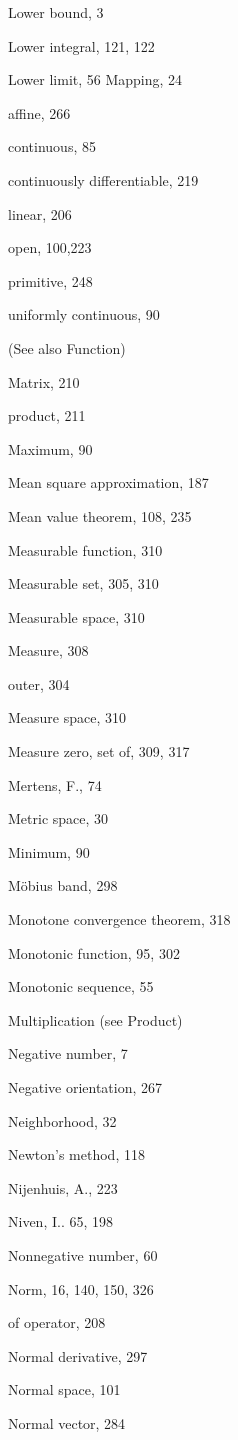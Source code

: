 \documentclass[10pt]{article}
\begin{document}
Lower bound, 3

Lower integral, 121, 122

Lower limit, 56
Mapping, 24

affine, 266

continuous, 85

continuously differentiable, 219

linear, 206

open, 100,223

primitive, 248

uniformly continuous, 90

(See also Function)

Matrix, 210

product, 211

Maximum, 90

Mean square approximation, 187

Mean value theorem, 108, 235

Measurable function, 310

Measurable set, 305, 310

Measurable space, 310

Measure, 308

outer, 304

Measure space, 310

Measure zero, set of, 309, 317

Mertens, F., 74

Metric space, 30

Minimum, 90

Möbius band, 298

Monotone convergence theorem, 318

Monotonic function, 95, 302

Monotonic sequence, 55

Multiplication (see Product)

Negative number, 7

Negative orientation, 267

Neighborhood, 32

Newton's method, 118

Nijenhuis, A., 223

Niven, I.. 65, 198

Nonnegative number, 60

Norm, 16, 140, 150, 326

of operator, 208

Normal derivative, 297

Normal space, 101

Normal vector, 284
\end{document}
